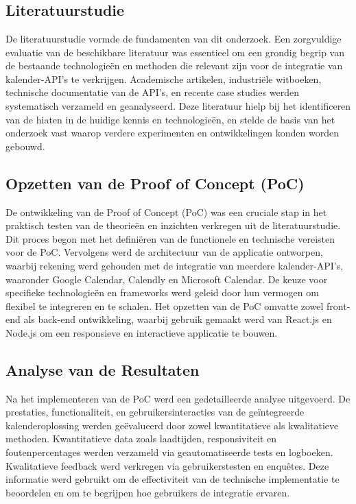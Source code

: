 
\chapter{}%
\label{ch:methodologie}


\section{Literatuurstudie}
De literatuurstudie vormde de fundamenten van dit onderzoek. Een zorgvuldige evaluatie van de beschikbare literatuur was essentieel om een grondig begrip van de bestaande technologieën en methoden die relevant zijn voor de integratie van kalender-API's te verkrijgen. Academische artikelen, industriële witboeken, technische documentatie van de API's, en recente case studies werden systematisch verzameld en geanalyseerd. Deze literatuur hielp bij het identificeren van de hiaten in de huidige kennis en technologieën, en stelde de basis van het onderzoek vast waarop verdere experimenten en ontwikkelingen konden worden gebouwd.

\section{Opzetten van de Proof of Concept (PoC)}
De ontwikkeling van de Proof of Concept (PoC) was een cruciale stap in het praktisch testen van de theorieën en inzichten verkregen uit de literatuurstudie. Dit proces begon met het definiëren van de functionele en technische vereisten voor de PoC. Vervolgens werd de architectuur van de applicatie ontworpen, waarbij rekening werd gehouden met de integratie van meerdere kalender-API's, waaronder Google Calendar, Calendly en Microsoft Calendar. De keuze voor specifieke technologieën en frameworks werd geleid door hun vermogen om flexibel te integreren en te schalen. Het opzetten van de PoC omvatte zowel front-end als back-end ontwikkeling, waarbij gebruik gemaakt werd van React.js en Node.js om een responsieve en interactieve applicatie te bouwen.

\section{Analyse van de Resultaten}
Na het implementeren van de PoC werd een gedetailleerde analyse uitgevoerd. De prestaties, functionaliteit, en gebruikersinteracties van de geïntegreerde kalenderoplossing werden geëvalueerd door zowel kwantitatieve als kwalitatieve methoden. Kwantitatieve data zoals laadtijden, responsiviteit en foutenpercentages werden verzameld via geautomatiseerde tests en logboeken. Kwalitatieve feedback werd verkregen via gebruikerstesten en enquêtes. Deze informatie werd gebruikt om de effectiviteit van de technische implementatie te beoordelen en om te begrijpen hoe gebruikers de integratie ervaren.

